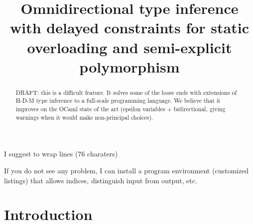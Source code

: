 \documentclass[acmsmall,screen,nonacm]{acmart}
\begin{document}
\title{Omnidirectional type inference with delayed constraints
   for static overloading and semi-explicit polymorphism}

\begin{abstract}


  DRAFT: this is a difficult feature. It solves some of the loose ends
  with extensions of H-D-M type inference to a full-scale programming
  language. We believe that it improves on the OCaml state of the art
  (epsilon variables + bidirectional, giving warnings when it would
  make non-principal choices).
\end{abstract}


\maketitle

\begin{version}{\color{darkgreen}\True}
I suggest to wrap lines (76 charaters)

If you do not see any problem, I can install a program environment 
(customized listings) that allows indices, distinguish input from output,
etc.

\end{version}



\section{Introduction}
\end{document}
